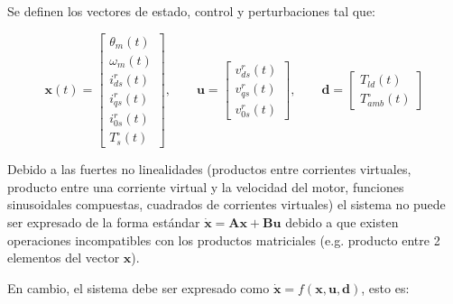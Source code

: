 \documentclass[blue,fullpaper]{ludusofficial}  %
\begin{document}
Se definen los vectores de estado, control y perturbaciones tal que:

\begin{equation}
\label{eq:vectores-globales}
    \mathbf{x}(t)= \begin{bmatrix} \theta_{m}(t) \\ \omega_{m}(t) \\ i_{ds}^{r}(t) \\ i_{qs}^{r}(t) \\ i_{0s}^{r}(t) \\ T_{s}^{\circ}(t) \end{bmatrix}, \qquad \mathbf{u}=\begin{bmatrix} v_{ds}^{r}(t) \\ v_{qs}^{r}(t) \\ v_{0s}^{r}(t) \end{bmatrix}, \qquad \mathbf{d} = \begin{bmatrix} T_{ld}(t) \\ T_{amb}^{\circ}(t)  \end{bmatrix}
\end{equation}

Debido a las fuertes no linealidades (productos entre corrientes virtuales, producto entre una corriente virtual y la velocidad del motor, funciones sinusoidales compuestas, cuadrados de corrientes virtuales) el sistema no puede ser expresado de la forma estándar $\dot{\mathbf{x}}= \mathbf{A} \mathbf{x} + \mathbf{B} \mathbf{u}$ debido a que existen operaciones incompatibles con los productos matriciales (e.g. producto entre 2 elementos del vector $\mathbf{x}$).

En cambio, el sistema debe ser expresado como $\dot{\mathbf{x}}= f (\mathbf{x}, \mathbf{u}, \mathbf{d})$, esto es:
\end{document}

